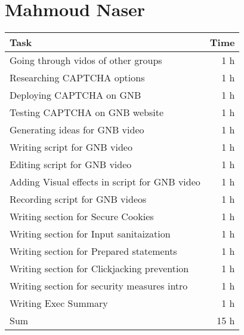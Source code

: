 \clearpage
\section*{Mahmoud Naser}
\begin{table}[h!tpb]
  \centering
  \begin{tabularx}{\textwidth}{X r}
    \toprule
      Task & Time \\
    \midrule
      Going through vidos of other groups & 1 h \\
      Researching CAPTCHA options & 1 h \\
      Deploying CAPTCHA on GNB & 1 h \\
      Testing CAPTCHA on GNB website & 1 h \\
      Generating ideas for GNB video & 1 h \\
      Writing script for GNB video & 1 h \\
      Editing script for GNB video & 1 h \\
      Adding Visual effects in script for GNB video & 1 h \\
      Recording script for GNB videos & 1 h\\ 
      Writing section for Secure Cookies & 1 h\\
      Writing section for Input sanitaization & 1 h\\
      Writing section for Prepared statements & 1 h\\
      Writing section for Clickjacking prevention & 1 h\\
      Writing section for security measures intro & 1 h\\
      Writing Exec Summary & 1 h\\
    \midrule
      Sum & 15 h \\
    \bottomrule
  \end{tabularx}
\end{table}
